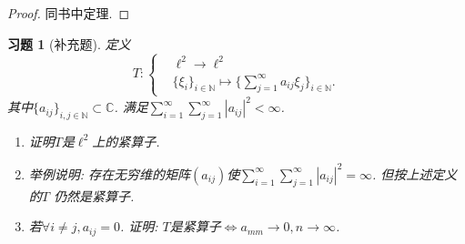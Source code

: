 \documentclass[UTF8,twoside]{ctexbook}
\newtheorem{exercise}{习题}[section]
\newcommand{\kx}{\mathbb}
\numberwithin{equation}{section}
\begin{document}
	\begin{proof}
		同书中定理.
	\end{proof}
	\begin{exercise}[补充题]
		定义
		\[T:\left\{\begin{aligned}
		&\ell^2\rightarrow\ell^2\\
		&\{\xi_i\}_{i\in\kx N}\mapsto\{\sum_{j=1}^{\infty}a_{ij}\xi_j\}_{i\in\kx N}.
		\end{aligned}\right.
		\]
		其中$\{a_{ij}\}_{i,j\in\kx N}\subset\kx C$. 满足$\sum_{i=1}^{\infty}\sum_{j=1}^{\infty}|a_{ij}|^2<\infty$.
		\begin{enumerate}[1)]
			\item 证明$T$是$\ell^2$上的紧算子.
			\item 举例说明: 存在无穷维的矩阵$(a_{ij})$使$\sum_{i=1}^{\infty}\sum_{j=1}^{\infty}|a_{ij}|^2=\infty$. 但按上述定义的$T$ 仍然是紧算子.
			\item 若$\forall i\neq j, a_{ij}=0$. 证明: $T$是紧算子$\Longleftrightarrow$$a_{mm}\rightarrow 0,n\rightarrow\infty$.
		\end{enumerate}
	\end{exercise}
\end{document}
